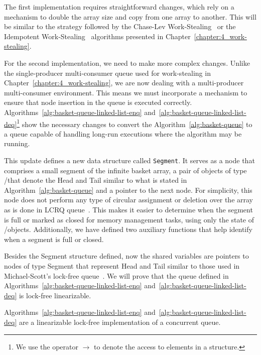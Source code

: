The first implementation requires straightforward changes, which rely on a mechanism to double the array size and copy from one array to another. This will be similar to the strategy followed by the Chase-Lev Work-Stealing~\cite{circular.work.stealing} or the Idempotent Work-Stealing~\cite{maged.vechev.2009} algorithms presented in Chapter~\ref{chapter:4_work-stealing}. 

For the second implementation, we need to make more complex changes. Unlike the single-producer multi-consumer queue used for work-stealing in Chapter~\ref{chapter:4_work-stealing}, we are now dealing with a multi-producer multi-consumer environment. This means we must incorporate a mechanism to ensure that node insertion in the queue is executed correctly.  Algorithms~\ref{alg:basket-queue-linked-list-enq} and~\ref{alg:basket-queue-linked-list-deq}\footnote{We use the operator \(\rightarrow\) to denote the access to elements in a structure.} show the necessary changes to convert the Algorithm~\ref{alg:basket-queue} to a queue capable of handling long-run executions where the algorithm may be running.

This update defines a new data structure called \texttt{Segment}. It serves as a node that comprises a small segment of the infinite basket array, a pair of objects of type \LL/\IC that denote the Head and Tail similar to what is stated in Algorithm~\ref{alg:basket-queue} and a pointer to the next node. For simplicity, this node does not perform any type of circular assignment or deletion over the array as is done in LCRQ queue~\cite{ppopp2013x86queues}. This makes it easier to determine when the segment is full or marked as closed for memory management tasks, using only the state of \LL/\IC objects. Additionally, we have defined two auxiliary functions that help identify when a segment is full or closed.

Besides the Segment structure defined, now the shared variables are pointers to nodes of type Segment that represent Head and Tail similar to those used in Michael-Scott's lock-free queue~\cite{DBLP_conf_podc_MichaelS96}. We will prove that the queue defined in Algorithms~\ref{alg:basket-queue-linked-list-enq} and~\ref{alg:basket-queue-linked-list-deq} is lock-free linearizable.


\begin{theorem}
    Algorithms~\ref{alg:basket-queue-linked-list-enq} and~\ref{alg:basket-queue-linked-list-deq} are a linearizable lock-free implementation of a concurrent queue.
\end{theorem}

